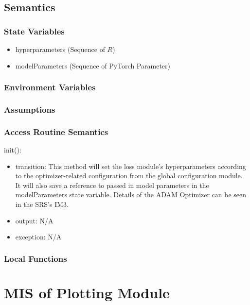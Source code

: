 \documentclass[12pt, titlepage]{article}
\begin{document}
\subsection{Semantics}

\subsubsection{State Variables}

\begin{itemize}
  \item hyperparameters (Sequence of $R$)
  \item modelParameters (Sequence of PyTorch Parameter)
\end{itemize}

\subsubsection{Environment Variables}



\subsubsection{Assumptions}



\subsubsection{Access Routine Semantics}
\noindent init():
\begin{itemize}
\item transition: This method will set the loss module's hyperparameters according to the optimizer-related configuration from the global configuration module. It will also save a reference to passed in model parameters in the modelParameters state variable. Details of the ADAM Optimizer can be seen in the SRS's IM3.
\item output: N/A
\item exception: N/A
\end{itemize}

\subsubsection{Local Functions}

\newpage

\section{MIS of Plotting Module} \label{ModulePlot} 
\end{document}
